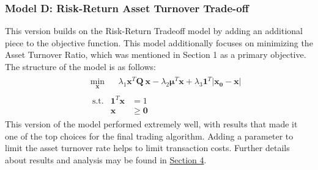 \documentclass[10pt]{article}
\begin{document}
\subsubsection{Model D: Risk-Return Asset Turnover Trade-off}
\label{sec:modelD}
This version builds on the Risk-Return Tradeoff model by adding an additional piece to the objective function. This model additionally focuses on minimizing the Asset Turnover Ratio, which was mentioned in Section 1 as a primary objective. The structure of the model is as follows:
\[
\begin{aligned}
&\begin{aligned}
    & \min_{\bm{x}}     &&\lambda_1 \bm{x}^T \bm{Q}\ \bm{x} -  \lambda_2\bm{\mu}^T \bm{x}  + \lambda_3 \bm{1}^T |\bm{x_0} - \bm{x}|
\end{aligned} \\
&\begin{aligned}
    &\ \mathrm{s.t.}        & \bm{1}^T \bm{x} &= 1 \\
    &                   & \bm{x} &\geq \bm{0}
\end{aligned}
\end{aligned}
\]
This version of the model performed extremely well, with results that made it one of the top choices for the final trading algorithm. Adding a parameter to limit the asset turnover rate helps to limit transaction costs. Further details about results and analysis may be found in \hyperref[sec:sec4] {\color{blue}Section 4}. 
\end{document}
